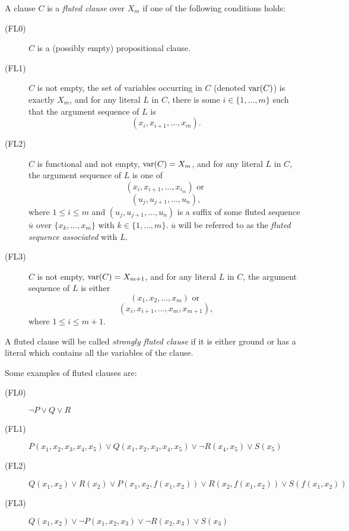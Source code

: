 \begin{definition}\label{def:fluted-clauses}
  A clause \(C\) is a \emph{fluted clause} over \(X_m\) if one of the following conditions holds:
  \begin{description}
    \item[(FL0)] \(C\) is a (possibly empty) propositional clause.
    \item[(FL1)] \(C\) is not empty, the set of variables occurring in \(C\) (denoted \(\text{var} (C)\)) is exactly \(X_m\), and for any literal \(L\) in \(C\), there is some \(i \in \{1,\ldots,m\}\) such that the argument sequence of \(L\) is
      \[(x_i, x_{i+1}, \ldots, x_m).\]
    \item[(FL2)] \(C\) is functional and not empty, \(\text{var} (C) = X_m\), and for any literal \(L\) in \(C\), the argument sequence of \(L\) is one of
      \[(x_{i},x_{i+1}, \ldots, x_{i_m}) \text{ or }\]
      \[(u_j, u_{j+1}, \ldots, u_{n}),\]
    where \(1 \leq i \leq m\) and \((u_j, u_{j+1}, \ldots, u_{n})\) is a suffix of some fluted sequence \(\overline{u} \text{ over } \{x_k, \ldots, x_m\}\) with \(k \in \{1,\ldots,m\}\).
    \(\overline{u}\) will be referred to as the \emph{fluted sequence associated} with \(L\).
    \item[(FL3)] \(C\) is not empty, \(\text{var} (C) = X_{m+1}\), and for any literal \(L\) in \(C\), the argument sequence of \(L\) is either
      \[(x_{1},x_{2}, \ldots, x_{m}) \text{ or }\]
      \[(x_{i},x_{i+1}, \ldots, x_{m},x_{m+1}),\]
    where \(1 \leq i \leq m+1\).
  \end{description}
  A fluted clause will be called \emph{strongly fluted clause} if it is either ground or has a literal which contains all the variables of the clause.
\end{definition}

Some examples of fluted clauses are:
\begin{description}
  \item[(FL0)] \(\neg P \lor Q \lor R\)
  \item[(FL1)] \(P(x_1,x_2,x_3,x_4,x_5) \lor Q(x_1,x_2,x_3,x_4,x_5) \lor \neg R(x_4,x_5) \lor S(x_5)\)
  \item[(FL2)] \(Q(x_1,x_2) \lor R(x_2) \lor P(x_1,x_2,f(x_1,x_2))\lor R(x_2,f(x_1,x_2)) \lor S(f(x_1,x_2))\)
  \item[(FL3)] \(Q(x_1,x_2) \lor \neg P(x_1,x_2,x_3) \lor \neg R(x_2,x_3) \lor S(x_3)\)
\end{description}

